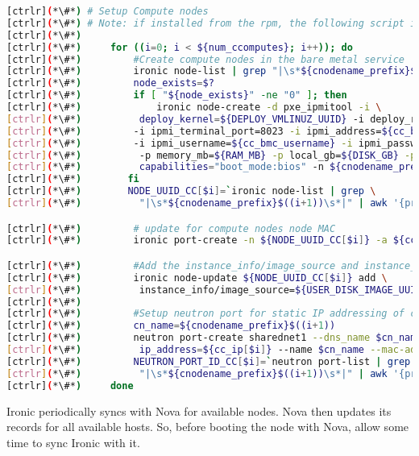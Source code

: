 \begin{lstlisting}[language=bash,keywords={}]
[ctrlr](*\#*) # Setup Compute nodes
[ctrlr](*\#*) # Note: if installed from the rpm, the following script is installed as setup_compute_nodes.sh 
[ctrlr](*\#*) 
[ctrlr](*\#*)     for ((i=0; i < ${num_ccomputes}; i++)); do
[ctrlr](*\#*)         #Create compute nodes in the bare metal service
[ctrlr](*\#*)         ironic node-list | grep "|\s*${cnodename_prefix}$((i+1))\s*|"
[ctrlr](*\#*)         node_exists=$?
[ctrlr](*\#*)         if [ "${node_exists}" -ne "0" ]; then
[ctrlr](*\#*)             ironic node-create -d pxe_ipmitool -i \
[ctrlr](*\#*)          deploy_kernel=${DEPLOY_VMLINUZ_UUID} -i deploy_ramdisk=${DEPLOY_INITRD_UUID} \
[ctrlr](*\#*)         -i ipmi_terminal_port=8023 -i ipmi_address=${cc_bmc[$i]} \
[ctrlr](*\#*)         -i ipmi_username=${cc_bmc_username} -i ipmi_password=${cc_bmc_password} -p cpus=${CPU} \
[ctrlr](*\#*)          -p memory_mb=${RAM_MB} -p local_gb=${DISK_GB} -p cpu_arch=${ARCH} -p \
[ctrlr](*\#*)          capabilities="boot_mode:bios" -n ${cnodename_prefix}$((i+1))
[ctrlr](*\#*)        fi
[ctrlr](*\#*)        NODE_UUID_CC[$i]=`ironic node-list | grep \
[ctrlr](*\#*)          "|\s*${cnodename_prefix}$((i+1))\s*|" | awk '{print $2}'`

[ctrlr](*\#*)         # update for compute nodes node MAC
[ctrlr](*\#*)         ironic port-create -n ${NODE_UUID_CC[$i]} -a ${cc_mac[$i]}

[ctrlr](*\#*)         #Add the instance_info/image_source and instance_info/root_gb
[ctrlr](*\#*)         ironic node-update ${NODE_UUID_CC[$i]} add \
[ctrlr](*\#*)          instance_info/image_source=${USER_DISK_IMAGE_UUID} instance_info/root_gb=50
[ctrlr](*\#*) 
[ctrlr](*\#*)         #Setup neutron port for static IP addressing of compute nodes
[ctrlr](*\#*)         cn_name=${cnodename_prefix}$((i+1))
[ctrlr](*\#*)         neutron port-create sharednet1 --dns_name $cn_name --fixed-ip \
[ctrlr](*\#*)          ip_address=${cc_ip[$i]} --name $cn_name --mac-address ${cc_mac[$i]}
[ctrlr](*\#*)         NEUTRON_PORT_ID_CC[$i]=`neutron port-list | grep \
[ctrlr](*\#*)          "|\s*${cnodename_prefix}$((i+1))\s*|" | awk '{print $2}'`
[ctrlr](*\#*)     done
\end{lstlisting} 
\newpage

	Ironic periodically syncs with Nova for available nodes. Nova then updates its records for all available hosts. So, before booting the node with Nova, allow some time to sync Ironic with it. 

